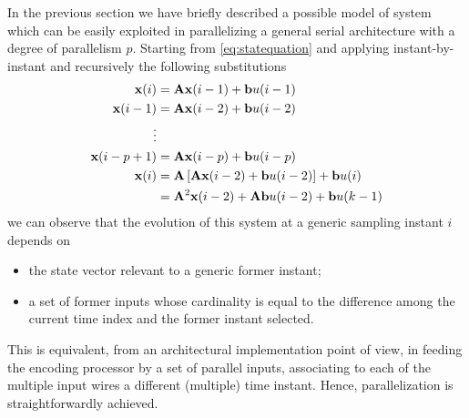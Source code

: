 In the previous section we have briefly described a possible model of system
which can be easily exploited in parallelizing a general serial architecture
with a degree of parallelism $p$. Starting from \eqref{eq:statequation} and
applying instant-by-instant and recursively the following substitutions
\begin{align*}
\mathbf{x}(i) &= \mathbf{Ax}(i-1) + \mathbf{b}u(i-1)\\
\mathbf{x}(i-1) &= \mathbf{Ax}(i-2) + \mathbf{b}u(i-2)\\
\vdots \\
\mathbf{x}(i-p+1) &= \mathbf{Ax}(i-p) + \mathbf{b}u(i-p)\\
\mathbf{x}(i) &= \mathbf{A} \left[ \mathbf{Ax}(i-2) + \mathbf{b}u(i-2)\right] + \mathbf{b}u(i)\\
&= \mathbf{A}^2 \mathbf{x} (i-2) + \mathbf{Ab} u(i-2) + \mathbf{b} u(k-1)
\end{align*}
we can observe that the evolution of this system at a generic sampling instant $i$ depends on
\begin{itemize}
\item the state vector relevant to a generic former instant;
\item a set of former inputs whose cardinality is equal to the difference among the current time index and the former instant selected.
\end{itemize}

This is equivalent, from an architectural implementation point of view, in feeding the encoding processor by a set of parallel inputs, associating to each of the multiple input wires a different (multiple) time instant. Hence, parallelization is straightforwardly achieved.

